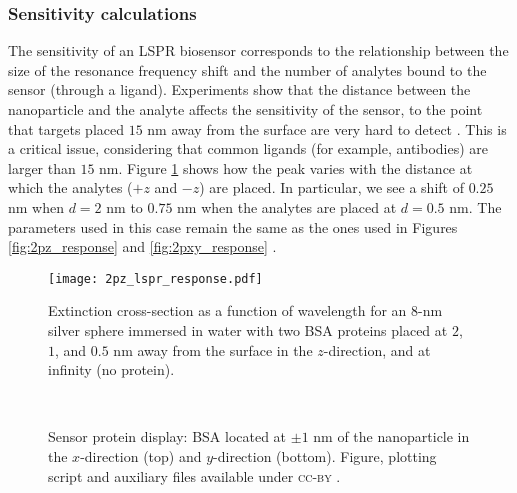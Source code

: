 \subsubsection{Sensitivity calculations} \label{sec:bsa_sensitivity}

The sensitivity of an LSPR biosensor corresponds to the relationship between the size 
of the resonance frequency shift and the number of analytes bound to the sensor (through a ligand).
Experiments show that the distance between the nanoparticle and the analyte 
affects the sensitivity of the sensor, to the point that
targets placed $15$ nm away from the surface are very hard to detect \cite{HaesETal2004}.
This is a critical issue, considering that common ligands (for example, antibodies) are
larger than $15$ nm. Figure \ref{fig:dist_response} 
shows how the peak varies with the distance at which the analytes ($+z$ and $-z$) are placed.  
In particular, we see a shift of $0.25$ nm when $d=2$ nm to $0.75$ nm when the 
analytes are placed at $d=0.5$ nm. The parameters used in this case remain 
the same as the ones used in Figures \ref{fig:2pz_response} and \ref{fig:2pxy_response} .


\begin{figure}%
   \centering
   \texttt{[image: 2pz\_lspr\_response.pdf]} 
   \caption{Extinction cross-section as a function of wavelength for an $8$-nm
            silver sphere immersed in water with two BSA proteins placed at
            $2$, $1$, and $0.5$ nm away from the surface in the 
            $z$-direction, and at infinity (no protein).}
   \label{fig:dist_response}
\end{figure}




\begin{figure*}
   \centering
    \\
%
\vspace{-0.5cm}
    \caption{Sensor protein display: BSA located at $\pm 1$ nm of the nanoparticle in the
           $x$-direction (top) and $y$-direction (bottom). Figure, plotting script and auxiliary files available under \textsc{cc-by} \cite{ClementiETal2018e}.}
    \label{fig:display_xy}
\end{figure*}


